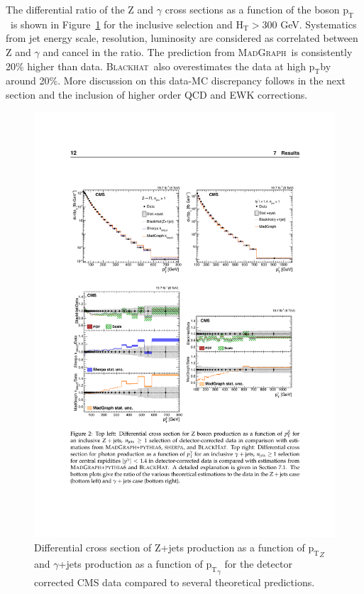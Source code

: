 \documentclass[a4paper,11pt,notoc]{article}
\newcommand{\pt}{\ensuremath{\mathrm{p_T}}}
\newcommand{\Ht}{\ensuremath{\mathrm{H_T}}}
\newcommand{\BLACKHAT}{\textsc{Blackhat}}
\newcommand{\MADGRAPH}{\textsc{MadGraph}}
\begin{document}
The differential ratio of the Z and $\gamma$ cross sections as a function of the boson \pt\ is shown in Figure~\ref{fig:ptZgamma-CMS} for the inclusive selection and $\Ht > 300$ GeV. Systematics from jet energy scale, resolution, luminosity are considered as correlated between Z and $\gamma$ and cancel in the ratio. The prediction from \MADGRAPH\ is consistently 20\% higher than data. \BLACKHAT\ also overestimates the data at high \pt by around 20\%. More discussion on this data-MC discrepancy follows in the next section and the inclusion of higher order QCD and EWK corrections. 

\begin{figure}[t!]
\centering
\includegraphics[width=0.9\columnwidth]{ptZ-ptgamma-CMS.pdf} 
\caption{Differential cross section of Z+jets production as a function of $\pt_{Z}$ and $\gamma$+jets production as a function of $\pt_{\gamma}$ for the detector corrected CMS data compared to several theoretical predictions.}
\label{fig:ptZgamma-CMS}
\end{figure}   
\end{document}
